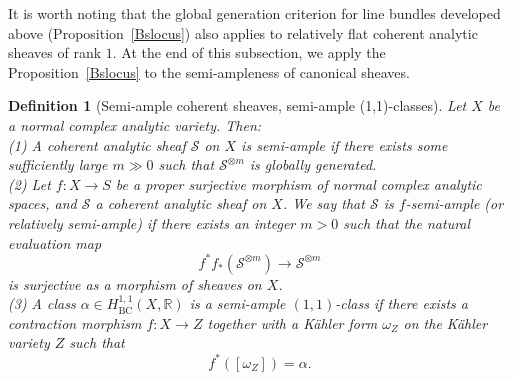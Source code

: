 \documentclass[12pt]{amsart}
\numberwithin{equation}{section}
\theoremstyle{definition}
\theoremstyle{plain}
\newtheorem{definition}  [theorem]     {Definition}
\newtheorem*{thm A*}{Theorem A}
\newtheorem*{thm B*}{Theorem B}
\newtheorem*{thm C*}{Theorem C}
\newtheorem*{thm D*}{Theorem D}
\theoremstyle{definition}
\renewcommand{\1}{\mathds{1}}
\renewcommand{\>}{\rightarrow}
\begin{document}
It is worth noting that the global generation criterion for line bundles developed above (Proposition~\ref{Bslocus}) also applies to relatively flat coherent analytic sheaves of rank $1$.
At the end of this subsection, we apply the Proposition~\ref{Bslocus} to the semi-ampleness of canonical sheaves.
\begin{definition}[Semi-ample coherent sheaves, semi-ample (1,1)-classes]\label{DefinitionSemiample}
Let $X$ be a normal complex analytic variety. Then:\\
\emph{(1)} A coherent analytic sheaf $\mathcal{S}$ on $X$ is \emph{semi-ample} if there exists some sufficiently large $m \gg 0$ such that $\mathcal{S}^{\otimes m}$ is globally generated. \\
\emph{(2)} Let $f: X \rightarrow S$ be a proper surjective morphism of normal complex analytic spaces, and $\mathcal{S}$ a coherent analytic sheaf on $X$. We say that $\mathcal{S}$ is \emph{$f$-semi-ample} (or \emph{relatively semi-ample}) if there exists an integer $m>0$ such that the natural evaluation map
$$
f^* f_*\left(\mathcal{S}^{\otimes m}\right) \longrightarrow \mathcal{S}^{\otimes m}
$$
is surjective as a morphism of sheaves on $X$.\\
\emph{(3)} A class $\alpha \in H^{1,1}_{\mathrm{BC}}(X,\mathbb{R})$ is a \emph{semi-ample $(1,1)$-class} if there exists a contraction morphism  $f : X \to Z$ 
together with a K\"ahler form $\omega_Z$ on the K\"ahler variety  $Z$ such that  
\[
f^*([\omega_Z]) = \alpha.
\] 
\end{definition}
\end{document}
